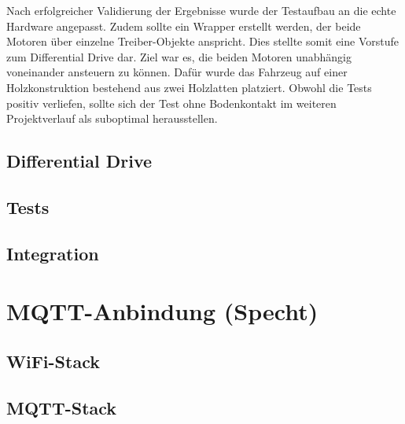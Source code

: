 Nach erfolgreicher Validierung der Ergebnisse wurde der Testaufbau an die echte Hardware angepasst. Zudem sollte ein Wrapper erstellt werden, der beide Motoren über einzelne Treiber-Objekte anspricht. Dies stellte somit eine Vorstufe zum Differential Drive dar. Ziel war es, die beiden Motoren unabhängig voneinander ansteuern zu können. Dafür wurde das Fahrzeug auf einer Holzkonstruktion bestehend aus zwei Holzlatten platziert. Obwohl die Tests positiv verliefen, sollte sich der Test ohne Bodenkontakt im weiteren Projektverlauf als suboptimal herausstellen.

\subsection{Differential Drive}



\subsection{Tests}

\subsection{Integration}

\section{MQTT-Anbindung (Specht)}

\subsection{WiFi-Stack}

\subsection{MQTT-Stack}

